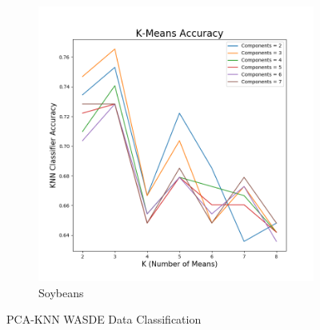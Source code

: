 \documentclass{article}
\begin{document}
\begin{figure}[H]
\begin{subfigure}{.5\textwidth}
  \includegraphics[scale=.38]{images/soyacc2,7,w}
\caption{Soybeans}
\end{subfigure}
\caption{PCA-KNN WASDE Data Classification}
\end{figure}
\end{document}
